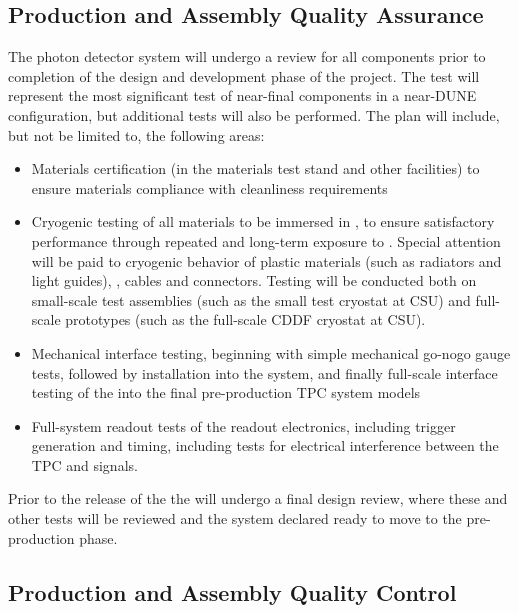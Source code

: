 \subsection{Production and Assembly Quality Assurance}
\label{sec:fdsp-pd-prodqa}

The photon detector system will undergo a  review for all components prior to completion of the design and development phase of the project.  The  test will represent the most significant test of near-final  components in a near-DUNE configuration, but additional tests will also be performed.  The  plan will include, but not be limited to, the following areas:

\begin{itemize}
\item Materials certification (in the  materials test stand and other facilities) to ensure materials compliance with cleanliness requirements
\item Cryogenic testing of all materials to be immersed in \lar, to ensure satisfactory performance through repeated and long-term exposure to \lar.  Special attention will be paid to cryogenic behavior of plastic materials (such as radiators and light guides), , cables and connectors.  Testing will be conducted both on small-scale test assemblies (such as the small test cryostat at CSU) and full-scale prototypes (such as the full-scale CDDF cryostat at CSU). 
\item Mechanical interface testing, beginning with simple mechanical go-nogo gauge tests, followed by installation into the  system, and finally full-scale interface testing of the  into the final pre-production TPC system models
\item Full-system readout tests of the  readout electronics, including trigger generation and timing, including tests for electrical interference between the TPC and  signals.
\end{itemize}

Prior to the release of the  the  will undergo a final design review, where these and other  tests will be reviewed and the system declared ready to move to the pre-production phase.


\subsection{Production and Assembly Quality Control}
\label{sec:fdsp-pd-prodqc}

